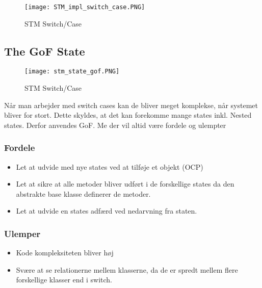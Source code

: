 \documentclass[../SWD_disp.tex]{subfiles}
\begin{document}
\begin{figure}[H]
    \centering
    \texttt{[image: STM\_impl\_switch\_case.PNG]}
    \caption{STM Switch/Case}
    \label{fig:stm_switch_case}
\end{figure}

\subsection{The GoF State}
\begin{figure}[H]
    \centering
    \texttt{[image: stm\_state\_gof.PNG]}
    \caption{STM Switch/Case}
    \label{fig:stm_state_gof}
\end{figure}

Når man arbejder med switch cases kan de bliver meget komplekse, når systemet bliver for stort. Dette skyldes, at det kan forekomme mange states inkl. Nested states. Derfor anvendes GoF. Me der vil altid være fordele og ulempter

\subsubsection*{Fordele}
\begin{itemize}
    \item Let at udvide med nye states ved at tilføje et objekt (OCP)
    \item Let at sikre at alle metoder bliver udført i de forskellige states da den abstrakte base klasse definerer de metoder.
    \item Let at udvide en states adfærd ved nedarvning fra staten.
\end{itemize}

\subsubsection{Ulemper}
\begin{itemize}
    \item Kode kompleksiteten bliver høj
    \item Svære at se relationerne mellem klasserne, da de er spredt mellem flere forskellige klasser end i switch.
\end{itemize}
\end{document}
